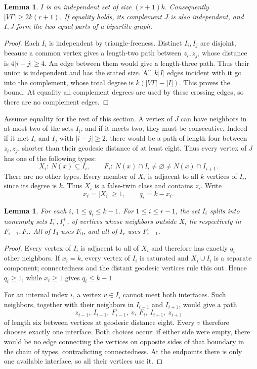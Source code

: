 \documentclass[11pt]{article}
\newtheorem{lemma}[theorem]{Lemma}
\begin{document}
\begin{lemma}\label{lower}
$I$ is an independent set of size $(r+1)k$. Consequently
$|V\Gamma|\geq2k(r+1)$. If equality holds, its complement $J$ is also
independent, and $I,J$ form the two equal parts of a bipartite graph.
\end{lemma}
\begin{proof}
Each $I_i$ is independent by triangle-freeness. Distinct $I_i,I_j$
are disjoint, because a common vertex gives a length-two path between
$z_i,z_j$, whose distance is $4|i-j|\geq4$. An edge between them
would give a length-three path. Thus their union is independent and
has the stated size. All $k|I|$ edges incident with it go into the
complement, whose total degree is $k(|V\Gamma|-|I|)$. This proves
the bound. At equality all complement degrees are used by these
crossing edges, so there are no complement edges.
\end{proof}

Assume equality for the rest of this section. A vertex of $J$ can
have neighbors in at most two of the sets $I_i$, and if it meets two,
they must be consecutive. Indeed if it met $I_i$ and $I_j$ with
$|i-j|\geq2$, there would be a path of length four between $z_i,z_j$,
shorter than their geodesic distance of at least eight. Thus every
vertex of $J$ has one of the following types:
\[
 X_i:\ N(x)\subseteq I_i,\qquad
 F_i:\ N(x)\cap I_i\ne\varnothing\ne N(x)\cap I_{i+1}.
\]
There are no other types. Every member of $X_i$ is adjacent to all
$k$ vertices of $I_i$, since its degree is $k$. Thus $X_i$ is a
false-twin class and contains $z_i$. Write
\[
 x_i=|X_i|\geq1,\qquad q_i=k-x_i.
\]

\begin{lemma}\label{interfaces}
For each $i$, $1\leq q_i\leq k-1$. For $1\leq i\leq r-1$, the set
$I_i$ splits into nonempty sets $I_i^-,I_i^+$, of vertices whose
neighbors outside $X_i$ lie respectively in $F_{i-1},F_i$.
All of $I_0$ uses $F_0$, and all of $I_r$ uses $F_{r-1}$.
\end{lemma}
\begin{proof}
Every vertex of $I_i$ is adjacent to all of $X_i$ and therefore has
exactly $q_i$ other neighbors. If $x_i=k$, every vertex of $I_i$ is
saturated and $X_i\cup I_i$ is a separate component; connectedness
and the distant geodesic vertices rule this out. Hence $q_i\geq1$,
while $x_i\geq1$ gives $q_i\leq k-1$.

For an internal index $i$, a vertex $v\in I_i$ cannot meet both
interfaces. Such neighbors, together with their neighbors in
$I_{i-1}$ and $I_{i+1}$, would give a path
\[
 z_{i-1},\ I_{i-1},\ F_{i-1},\ v,\ F_i,\ I_{i+1},\ z_{i+1}
\]
of length six between vertices at geodesic distance eight.
Every $v$ therefore chooses exactly one interface. Both choices
occur: if either side were empty, there would be no edge connecting
the vertices on opposite sides of that boundary in the chain of
types, contradicting connectedness. At the endpoints there is only
one available interface, so all their vertices use it.
\end{proof}
\end{document}
